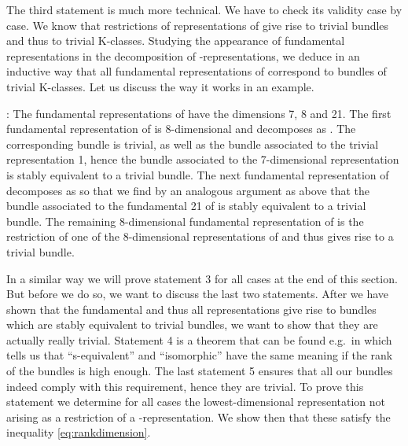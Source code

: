 \documentclass[12pt,a4paper]{article}
\providecommand{\embin}{{\hookrightarrow}}
\def\iG{G^\omega} %
\begin{document}
\begin{appendix}
The third statement is much more technical. We have to check its
validity case by case. We know that restrictions of
representations of \coordHE{} give rise to trivial bundles and thus to
trivial K-classes. Studying the appearance of fundamental
representations in the decomposition of \coordHE{}-representations, we deduce
in an inductive way that all fundamental representations of \myHighlight{$\iG $}\coordHE{}
correspond to bundles of trivial K-classes.
Let us discuss the way it works in an example.
\smallskip

\myHighlight{$B_{3}\embin D_{4}$}\coordHE{}: The fundamental representations of \coordHE{} have
the dimensions 7, 8 and 21. The first fundamental representation of
\coordHE{} is 8-dimensional and decomposes as \coordHE{}. The
corresponding bundle is trivial, as well as the bundle associated to
the trivial representation 1, hence the bundle associated to the
7-dimensional representation is stably equivalent to a trivial bundle.
The next fundamental representation of \coordHE{} decomposes as \coordHE{} so that we find by an analogous argument as above that the
bundle associated to the fundamental 21 of \coordHE{} is stably equivalent
to a trivial bundle. The remaining 8-dimensional fundamental representation of
\coordHE{} is the restriction of one of the 8-dimensional representations
of \coordHE{} and thus gives rise to a trivial bundle.\smallskip

In a similar way we will prove statement 3 for all cases at the end of
this section. But before
we do so, we want to discuss the last two statements. 
After we have shown that the fundamental and thus all representations
give rise to bundles which are stably equivalent to trivial bundles,
we want to show that they are actually really trivial.
Statement 4 is a theorem that can be found e.g.\ in \cite[Theorem
9.1.5]{Husemoller} which tells us that ``s-equivalent'' and ``isomorphic''
have the same meaning if the rank of the bundles is high enough.
The last statement 5 ensures that all our bundles indeed comply with 
this requirement, hence they are trivial. To prove this statement
we determine for all cases the lowest-dimensional representation
not arising as a restriction of a \coordHE{}-representation. We show then that
these satisfy the inequality \eqref{eq:rankdimension}. 


\end{appendix}
\end{document}

